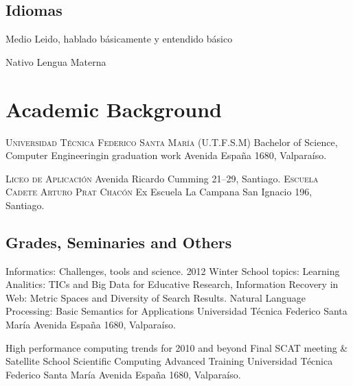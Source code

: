\documentclass[11pt,letterpaper,roman]{moderncv}
\begin{document}
\subsection{Idiomas}
	{Medio}
	{Leido, hablado b\'asicamente y entendido b\'asico}
	
	{Nativo}
	{Lengua Materna}

\section{Academic Background}
	{\textsc{Universidad T\'ecnica Federico Santa Mar\'ia (U.T.F.S.M)}}
	{Bachelor of Science, Computer Engineering}{in graduation work}
	{}
	{Avenida España 1680, Valparaíso.}
	

	{\textsc{Liceo de Aplicaci\'on}}
	{}
	{}
	{}
	{Avenida Ricardo Cumming 21--29, Santiago.}
	{\textsc{Escuela Cadete Arturo Prat Chac\'on}}
	{Ex Escuela La Campana}
	{}
	{}
	{San Ignacio 196, Santiago.}

\subsection{Grades, Seminaries and Others}

	{Informatics: Challenges, tools and science.}
	{2012 Winter School}
	{topics: Learning Analitics: TICs and Big Data for Educative Research, Information Recovery in Web: Metric Spaces and Diversity of Search Results. Natural Language Processing: Basic Semantics for Applications }
	{Universidad T\'ecnica Federico Santa Mar\'ia}
	{Avenida España 1680, Valpara\'iso.}
	
	
	{High performance computing trends for 2010 and beyond}
	{Final SCAT meeting \& Satellite School}
	{Scientific Computing Advanced Training}
	{Universidad T\'ecnica Federico Santa Mar\'ia}
	{Avenida España 1680, Valpara\'iso.}

%	
%	
%	
%
%	
\end{document}
